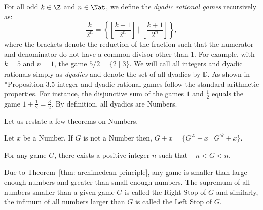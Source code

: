 \documentclass[oneside,reqno]{amsart}
\begin{document}
    For all odd $k\in \Z$ and $n\in \Nat$, we define the {\em dyadic rational games} recursively as: $$ \frac{k}{2^n}=\left\{ \left[\frac{k-1}{2^n}\right] \mid \left[\frac{k+1}{2^n}\right] \right\},$$ 
    where the brackets denote the reduction of the fraction such that the numerator and denominator do not have a common divisor other than 1. For example, with $k=5$ and $n=1$, the game $5/2=\{2\mid 3\}$. We will call all integers and dyadic rationals simply as {\em dyadics} and denote the set of all dyadics by $\mathbb{D}$. As shown in \cite{S2013}*{Proposition 3.5} integer and dyadic rational games follow the standard arithmetic properties. 
    For instance, the disjunctive sum of the games $1$ and $\frac{1}{2}$ equals the game $1+\frac{1}{2}=\frac{3}{2}$. By definition, all dyadics are Numbers. 
    
    Let us restate a few theorems on Numbers. 

    \begin{theorem}\label{thm: number avoidance}
        Let $x$ be a Number. If $G$ is not a Number then, $G+x=\{G^\mathcal L+x\mid G^\mathcal R+x\}$.
    \end{theorem}
    
   \begin{theorem}\label{thm: archimedean principle}
       For any game $G$, there exists a positive integer $n$ such that $-n<G<n$.
   \end{theorem}

    Due to Theorem~\ref{thm: archimedean principle}, any game is smaller than large enough numbers and greater than small enough numbers. 
    The supremum of all numbers smaller than a given game $G$ is called the Right Stop of $G$ and similarly, the infimum of all numbers larger than $G$ is called the Left Stop of $G$. 
    
\end{document}
